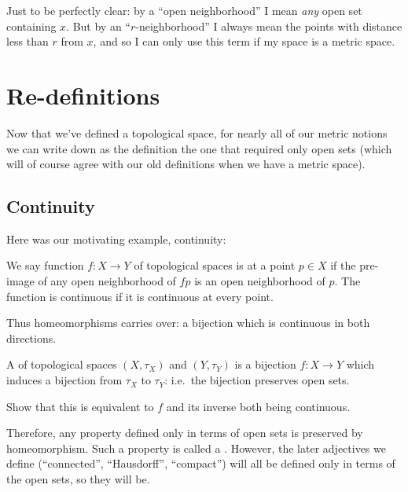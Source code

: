 \begin{abuse}
	Just to be perfectly clear:
	by a ``open neighborhood'' I mean \emph{any} open set containing $x$.
	But by an ``$r$-neighborhood'' I always mean the
	points with distance less than $r$ from $x$,
	and so I can only use this term if my space is a metric space.
\end{abuse}

\section{Re-definitions}
Now that we've defined a topological space,
for nearly all of our metric notions we can write down
as the definition the one that required only open sets
(which will of course agree with our old definitions
when we have a metric space).

\subsection{Continuity}
Here was our motivating example, continuity:
\begin{definition}
	We say function $f \colon X \to Y$ of topological spaces
	is  at a point $p \in X$ if the pre-image of any
	open neighborhood of $fp$ is an open neighborhood of $p$.
	The function is continuous if it is continuous at every point.
\end{definition}

Thus homeomorphisms carries over:
a bijection which is continuous in both directions.
\begin{definition}
	A  of topological spaces
	$(X, \tau_X)$ and $(Y, \tau_Y)$
	is a bijection $f \colon X \to Y$
	which induces a bijection from $\tau_X$ to $\tau_Y$:
	i.e.\ the bijection preserves open sets.
\end{definition}
\begin{ques}
	Show that this is equivalent to $f$ and its inverse
	both being continuous.
\end{ques}
Therefore, any property defined only in
terms of open sets is preserved by homeomorphism.
Such a property is called a .
However, the later adjectives we define 
(``connected'', ``Hausdorff'', ``compact'') will all be defined
only in terms of the open sets, so they will be.



